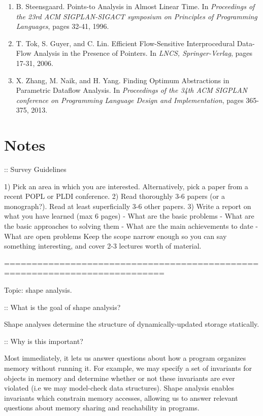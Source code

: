 \documentclass{article}
\begin{document}
\begin{enumerate}[1.]
{        Programming Languages}. 2002.
    \item B. Steensgaard. Points-to Analysis in Almost Linear Time. In
        \textit{Proceedings of the 23rd ACM SIGPLAN-SIGACT symposium on
        Principles of Programming Languages}, pages 32-41, 1996.
    \item T. Tok, S. Guyer, and C. Lin. Efficient Flow-Sensitive
        Interprocedural Data-Flow Analysis in the Presence of Pointers. In
        \textit{LNCS, Springer-Verlag}, pages 17-31, 2006.
    \item X. Zhang, M. Naik, and H. Yang. Finding Optimum Abstractions in
        Parametric Dataflow Analysis. In \textit{Proceedings of the 34th ACM
        SIGPLAN conference on Programming Language Design and
        Implementation}, pages 365-375, 2013.
\end{enumerate}

\section*{Notes}

:: Survey Guidelines

1) Pick an area in which you are interested. Alternatively, pick a paper
   from a recent POPL or PLDI conference. 
2) Read thoroughly 3-6 papers (or a monograph?). Read at least superficially
   3-6 other papers. 
3) Write a report on what you have learned (max 6 pages)
        - What are the basic problems
        - What are the basic approaches to solving them
        - What are the main achievements to date
        - What are open problems
Keep the scope narrow enough so you can say something interesting, and cover
2-3 lectures worth of material.

===========================================================================

Topic: shape analysis.

:: What is the goal of shape analysis?

Shape analyses determine the structure of dynamically-updated storage
statically.

:: Why is this important?

Most immediately, it lets us answer questions about how a program organizes
memory without running it. For example, we may specify a set of invariants
for objects in memory and determine whether or not these invariants are ever
violated (i.e we may model-check data structures). Shape analysis enables
invariants which constrain memory accesses, allowing us to answer relevant
questions about memory sharing and reachability in programs.
\end{document}
